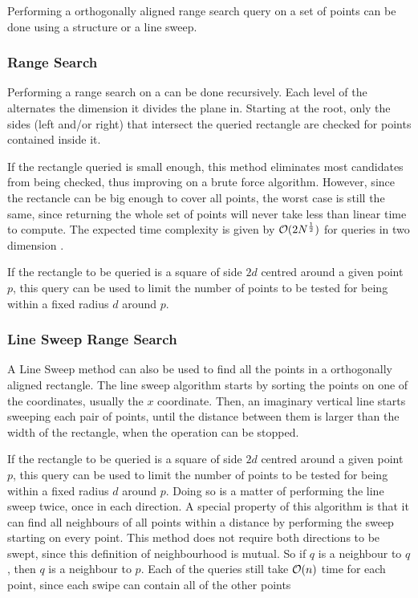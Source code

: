 Performing a orthogonally aligned range search query on a set of points can be done using a \kdtree structure or a line sweep.

\subsubsection*{\kdTree Range Search}
\label{sect:kdrs}
Performing a range search on a \kdTree can be done recursively. Each level of the \kdtree alternates the dimension it divides the plane in. Starting at the root, only the sides (left and/or right) that intersect the queried rectangle are checked for points contained inside it. 



If the rectangle queried is small enough, this method eliminates most candidates from being checked, thus improving on a brute force algorithm. However, since the rectancle can be big enough to cover all points, the worst case is still the same, since returning the whole set of points will never take less than linear time to compute. The expected time complexity is given by $\mathcal{O}(2N^{\frac{1}{2}})$ for queries in two dimension \cite{kdrange}.
	
If the rectangle to be queried is a square of side $2d$ centred around a given point $p$, this query can be used to limit the number of points to be tested for being within a fixed radius $d$ around $p$.


\subsubsection*{Line Sweep Range Search}
\label{sect:lsrs}
A Line Sweep method can also be used to find all the points in a orthogonally aligned rectangle. The line sweep algorithm starts by sorting the points on one of the coordinates, usually the $x$ coordinate. Then, an imaginary vertical line starts sweeping each pair of points, until the distance between them is larger than the width of the rectangle, when the operation can be stopped.
	


If the rectangle to be queried is a square of side $2d$ centred around a given point $p$, this query can be used to limit the number of points to be tested for being within a fixed radius $d$ around $p$. Doing so is a matter of performing the line sweep twice, once in each direction. A special property of this algorithm is that it can find all neighbours of all points within a distance by performing the sweep starting on every point. This method does not require both directions to be swept, since this definition of neighbourhood is mutual. So if $q$ is a neighbour to $q$, then $q$ is a neighbour to $p$. Each of the queries still take $\mathcal{O}(n)$  time for each point, since each swipe can contain all of the other points

